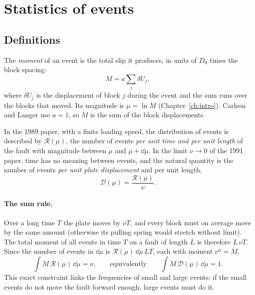 \section{Statistics of events}
\label{sec:bk-stats}

\subsection{Definitions}

The \emph{moment} of an event is the total slip it produces, in units of $D_0$ times the block spacing:
\begin{equation}
  M = a\sum_{j}\delta U_j ,
\end{equation}
where $\delta U_j$ is the displacement of block $j$ during the event and the sum runs over the blocks that moved. Its magnitude is $\mu = \ln M$
(Chapter~\ref{ch:intro}). Carlson and Langer use $a=1$, so $M$ is the sum of the block displacements.

In the 1989 paper, with a finite loading speed, the distribution of events is described by $\mathcal R(\mu)$, the number of events \emph{per unit time
and per unit length} of the fault with magnitude between $\mu$ and $\mu+\dd\mu$. In the limit $\nu\to0$ of the 1991 paper, time has no meaning between events,
and the natural quantity is the number of events \emph{per unit plate displacement} and per unit length,
\begin{equation}
  \mathcal D(\mu) = \frac{\mathcal R(\mu)}{\nu}.
\end{equation}

\paragraph{The sum rule.} Over a long time $T$ the plate moves by $\nu T$, and every block must on average move by the same amount (otherwise its pulling
spring would stretch without limit). The total moment of all events in time $T$ on a fault of length $L$ is therefore $L\,\nu T$. Since the number of events
in $\dd\mu$ is $\mathcal R(\mu)\,\dd\mu\, L T$, each with moment $e^\mu = M$,
\begin{equation}
  \int M\,\mathcal R(\mu)\,\dd\mu = \nu,\qquad\text{equivalently}\qquad \int M\,\mathcal D(\mu)\,\dd\mu = 1 .
  \label{eq:sumrule}
\end{equation}
This exact constraint links the frequencies of small and large events: if the small events do not move the fault forward enough, large events must do it.

